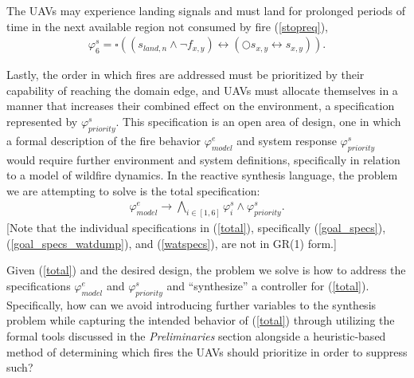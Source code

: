 \documentclass{ieeeaccess}
\newcommand{\always}{\square}
\newcommand{\next}{\bigcirc}
\begin{document}
The UAVs may experience landing signals and must land for prolonged periods of time in the next available region not consumed by fire (\ref{stopreq}),
\begin{equation}
\begin{aligned}
\varphi_{6}^{s} = \always ((s_{land,n} \land \lnot f_{x,y}) \leftrightarrow (\next s_{x,y} \leftrightarrow s_{x,y})).
\end{aligned}
\label{stopreq}
\end{equation}

Lastly, the order in which fires are addressed must be prioritized by their capability of reaching the domain edge, and UAVs must allocate themselves in a manner that increases their combined effect on the environment, a specification represented by $\varphi_{priority}^{s}$. This specification is an open area of design, one in which a formal description of the fire behavior $\varphi_{model}^{e}$ and system response $\varphi_{priority}^{s}$ would require further environment and system definitions, specifically in relation to a model of wildfire dynamics. In the reactive synthesis language, the problem we are attempting to solve is the total specification:
\begin{equation}
\begin{aligned}
\varphi_{model}^{e} \longrightarrow \bigwedge_{i \in [1,6]}\varphi_{i}^{s} \land \varphi_{priority}^s.
\end{aligned}
\label{total}
\end{equation}
[Note that the individual specifications in (\ref{total}), specifically (\ref{goal_specs}), (\ref{goal_specs_watdump}), and (\ref{watspecs}), are not in GR(1) form.]

Given (\ref{total}) and the desired design, the problem we solve is how to address the specifications $\varphi_{model}^{e}$ and $\varphi_{priority}^{s}$ and ``synthesize'' a controller for (\ref{total}). Specifically, how can we avoid introducing further variables to the synthesis problem while capturing the intended behavior of (\ref{total}) through utilizing the formal tools discussed in the \textit{Preliminaries} section alongside a heuristic-based method of determining which fires the UAVs should prioritize in order to suppress such?
\end{document}
